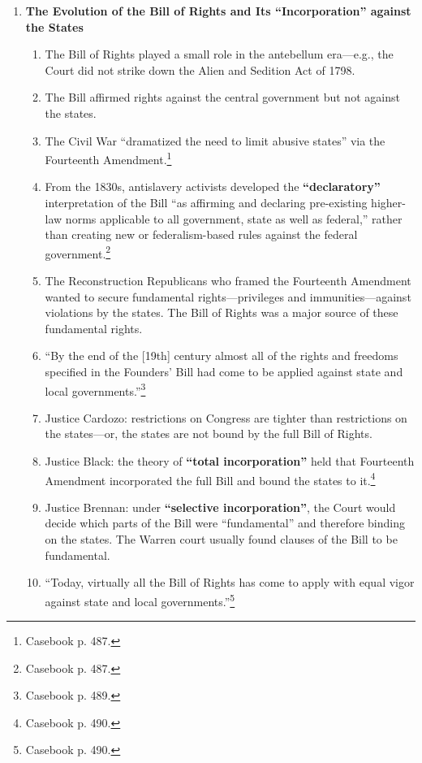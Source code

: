 \begin{enumerate}
    \item \textbf{The Evolution of the Bill of Rights and Its 
    ``Incorporation'' against the States}
    \begin{enumerate}
        \item The Bill of Rights played a small role in the antebellum 
        era---e.g., the Court did not strike down the Alien and Sedition Act 
        of 1798.
        \item The Bill affirmed rights against the central government but not 
        against the states.
        \item The Civil War ``dramatized the need to limit abusive states'' 
        via the Fourteenth Amendment.\footnote{Casebook p. 487.}
        \item From the 1830s, antislavery activists developed the 
        \textbf{``declaratory''} interpretation of the Bill ``as affirming and 
        declaring pre-existing higher-law norms applicable to all government, 
        state as well as federal,'' rather than creating new or 
        federalism-based rules against the federal 
        government.\footnote{Casebook p. 487.}
        \item The Reconstruction Republicans who framed the Fourteenth 
        Amendment wanted to secure fundamental rights---privileges and 
        immunities---against violations by the states. The Bill of Rights was 
        a major source of these fundamental rights.
        \item ``By the end of the [19th] century almost all of the rights and 
        freedoms specified in the Founders' Bill had come to be applied 
        against state and local governments.''\footnote{Casebook p. 489.}
        \item Justice Cardozo: restrictions on Congress are tighter than 
        restrictions on the states---or, the states are not bound by the full 
        Bill of Rights.
        \item Justice Black: the theory of \textbf{``total incorporation''} 
        held that Fourteenth Amendment incorporated the full Bill and bound 
        the states to it.\footnote{Casebook p. 490.} 
        \item Justice Brennan: under \textbf{``selective incorporation''}, the 
        Court would decide which parts of the Bill were ``fundamental'' and 
        therefore binding on the states. The Warren court usually found 
        clauses of the Bill to be fundamental.
        \item ``Today, virtually all the Bill of Rights has come to apply with 
        equal vigor against state and local governments.''\footnote{Casebook 
        p. 490.}
    \end{enumerate}
\end{enumerate}

